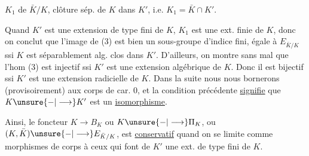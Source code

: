 $K_1$ de $\bar K/K$, clôture  sép. de $K$ dans $K'$, i.e. $K_1=\bar K\cap K'$.

Quand $K'$ est une extension de type fini de $K$, $K_1$ est une ext. finie de $K$, donc on conclut que l'image de (3) est bien un sous-groupe d'indice fini, égale à $E_{\bar K/K}$ ssi  $K$ est séparablement alg. clos dans $K'$. D'ailleurs, on montre sans mal que  l'hom (3) est injectif ssi $K'$ est une extension algébrique de $K$. Donc il est bijectif ssi $K'$ est une extension radicielle de $K$. Dans la suite nous nous bornerons (provisoirement) aux corps de car. $0$, et la condition précédente \uline{signifie}  que $K\unsure{-|\longrightarrow}K'$ est un \uline{isomorphisme}.

Ainsi, le foncteur $K\longrightarrow B_K$ ou $K\unsure{-|\longrightarrow}\Pi_K$, ou $(K,\bar K)\unsure{-|\longrightarrow}E_{\bar K/K}$, est \uline{conservatif} quand on se limite comme morphismes de corps  à ceux  qui font de $K'$ une ext. de type fini de $K$.
